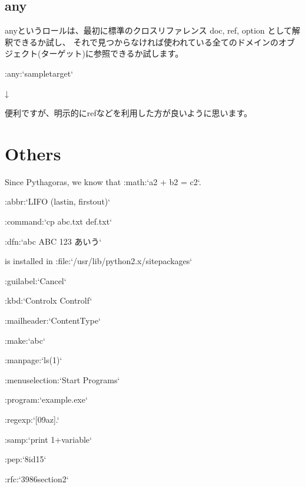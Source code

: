 \documentclass[letterpaper,10pt,dvipdfmx,openany,oneside]{sphinxmanual}
\begin{document}
{\hyperref[\detokenize{source/1.chapter/roles:sample-target}]{}}


\subsection{any}
\label{\detokenize{source/1.chapter/roles:any}}
anyというロールは、最初に標準のクロスリファレンス doc, ref, option として解釈できるか試し、
それで見つからなければ使われている全てのドメインのオブジェクト(ターゲット)に参照できるか試します。

%
\begin{sphinxVerbatim}[commandchars=\\\{\}]
:any:{}`sample\PYGZhy{}target{}`
\end{sphinxVerbatim}

↓

{\hyperref[\detokenize{source/1.chapter/roles:sample-target}]{}}

便利ですが、明示的にrefなどを利用した方が良いように思います。


\section{Others}
\label{\detokenize{source/1.chapter/roles:others}}
%
\begin{sphinxVerbatim}[commandchars=\\\{\}]
Since Pythagoras, we know that :math:{}`a\PYGZca{}2 + b\PYGZca{}2 = c\PYGZca{}2{}`.

:abbr:{}`LIFO (last\PYGZhy{}in, first\PYGZhy{}out){}`

:command:{}`cp abc.txt def.txt{}`

:dfn:{}`abc ABC 123 あいう{}`

is installed in :file:{}`/usr/lib/python2.\PYGZob{}x\PYGZcb{}/site\PYGZhy{}packages{}`

:guilabel:{}`\PYGZam{}Cancel{}`

:kbd:{}`Control\PYGZhy{}x Control\PYGZhy{}f{}`

:mailheader:{}`Content\PYGZhy{}Type{}`

:make:{}`abc{}`

:manpage:{}`ls(1){}`

:menuselection:{}`Start \PYGZhy{}\PYGZhy{}\PYGZgt{} Programs{}`

:program:{}`example.exe{}`

:regexp:{}`[0\PYGZhy{}9a\PYGZhy{}z].{}`

:samp:{}`print 1+\PYGZob{}variable\PYGZcb{}{}`

:pep:{}`8\PYGZsh{}id15{}`

:rfc:{}`3986\PYGZsh{}section\PYGZhy{}2{}`
\end{sphinxVerbatim}
\end{document}
